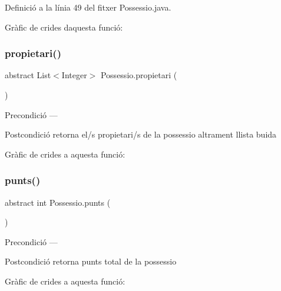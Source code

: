 Definició a la línia 49 del fitxer Possessio.\+java.

Gràfic de crides d\textquotesingle{}aquesta funció\+:
\mbox{\label{class_possessio_a514ceb05b8016e230eddbc7e3e43b325}} 
\subsubsection{\texorpdfstring{propietari()}{propietari()}}
{\footnotesize\ttfamily abstract List$<$Integer$>$ Possessio.\+propietari (\begin{DoxyParamCaption}{ }\end{DoxyParamCaption})\hspace{0.3cm}{\ttfamily [abstract]}}

\begin{DoxyPrecond}{Precondició}
--- 
\end{DoxyPrecond}
\begin{DoxyPostcond}{Postcondició}
retorna el/s propietari/s de la possessio altrament llista buida 
\end{DoxyPostcond}
Gràfic de crides a aquesta funció\+:
\mbox{\label{class_possessio_a8b774652b07b0b5eae3252cf0d7baba1}} 
\subsubsection{\texorpdfstring{punts()}{punts()}}
{\footnotesize\ttfamily abstract int Possessio.\+punts (\begin{DoxyParamCaption}{ }\end{DoxyParamCaption})\hspace{0.3cm}{\ttfamily [abstract]}}

\begin{DoxyPrecond}{Precondició}
--- 
\end{DoxyPrecond}
\begin{DoxyPostcond}{Postcondició}
retorna punts total de la possessio 
\end{DoxyPostcond}
Gràfic de crides a aquesta funció\+:
\mbox{\label{class_possessio_aaf57a4c4c4eb208a7a636c94182023f2}} 
